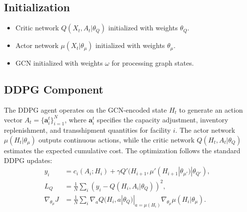 \documentclass[preprint,review,12pt,nonatbib]{elsarticle}
\begin{document}
\subsection*{Initialization}
\begin{itemize}
\item Critic network \( Q(X_t, A_t|\theta_Q) \) initialized with weights \( \theta_Q \).
\item Actor network \( \mu(X_t|\theta_\mu) \) initialized with weights \( \theta_\mu \).
\item GCN initialized with weights \( \omega \) for processing graph states.
\end{itemize}

\subsection*{DDPG Component}
The DDPG agent operates on the GCN-encoded state $H_t$ to generate an action vector 
$A_t = \{\mathbf{a}_i^t\}_{i=1}^{N}$, where $\mathbf{a}_i^t$ specifies the capacity adjustment,
inventory replenishment, and transshipment quantities for facility $i$. 
The actor network $\mu(H_t|\theta_\mu)$ outputs continuous actions, while the critic network
$Q(H_t,A_t|\theta_Q)$ estimates the expected cumulative cost. The optimization follows the standard
DDPG updates:
\begin{align}
y_i &= c_i(A_i;H_i) + \gamma Q'(H_{i+1},\mu'(H_{i+1}|\theta_{\mu'})|\theta_{Q'}),\\
L_Q &= \frac{1}{N}\sum_i (y_i - Q(H_i,A_i|\theta_Q))^2,\\
\nabla_{\theta_\mu} J &= \frac{1}{N}\sum_i \nabla_a Q(H_i,a|\theta_Q)|_{a=\mu(H_i)} 
\nabla_{\theta_\mu} \mu(H_i|\theta_\mu).
\end{align}
\end{document}
